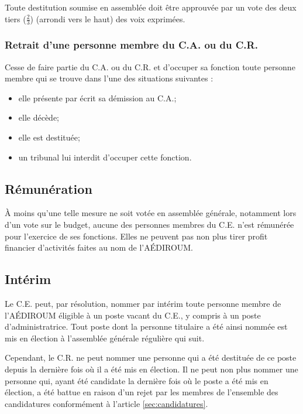 \documentclass{aediroum}
\newcommand{\article}[1]{article \ref{#1}}
\begin{document}
Toute destitution soumise en assemblée doit être approuvée par un vote des deux tiers ($\frac{2}{3}$) (arrondi vers le haut) des voix exprimées.

\subsubsection{Retrait d'une personne membre du C.A. ou du C.R.}\label{sec:retrait-dun-membre-exec-admin}

Cesse de faire partie du C.A. ou du C.R. et d'occuper sa fonction toute personne membre qui se trouve dans l'une des situations suivantes :
\begin{itemize}
    \item elle présente par écrit sa démission au C.A.;
    \item elle décède;
    \item elle est destituée;
    \item un tribunal lui interdit d'occuper cette fonction.
\end{itemize}

\subsection{Rémunération}\label{sec:renumeration}

À moins qu'une telle mesure ne soit votée en assemblée générale, notamment lors d'un vote sur le budget, aucune des personnes membres du C.E. n'est rémunérée pour l'exercice de ses fonctions. Elles ne peuvent pas non plus tirer profit financier d'activités faites au nom de l'AÉDIROUM.

\subsection{Intérim}\label{sec:interim}

Le C.E. peut, par résolution, nommer par intérim toute personne membre de l'AÉDIROUM éligible à un poste vacant du C.E., y compris à un poste d'administratrice. Tout poste dont la personne titulaire a été ainsi nommée est mis en élection à l'assemblée générale régulière qui suit.

Cependant, le C.R. ne peut nommer une personne qui a été destituée de ce poste depuis la dernière fois où il a été mis en élection. Il ne peut non plus nommer une personne qui, ayant été candidate la dernière fois où le poste a été mis en élection, a été battue en raison d'un rejet par les membres de l'ensemble des candidatures conformément à l'\article{sec:candidatures}.
\end{document}
